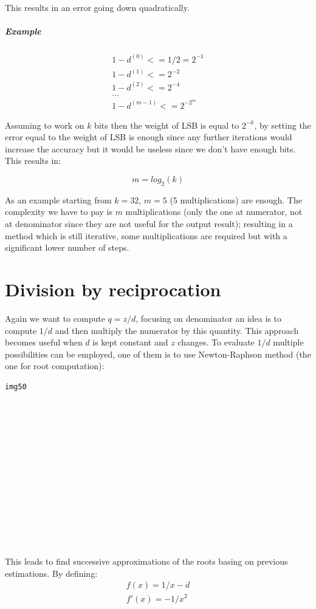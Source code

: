 This results in an error going down quadratically.

\subparagraph{Example}

\begin{eqnarray}
1-d^{(0)} <= 1/2 = 2^{-1}\\
1-d^{(1)} <= 2^{-2}\\
1-d^{(2)} <= 2^{-4}\\
...\\
1-d^{(m-1)} <= 2^{-2^m}
\end{eqnarray}

Assuming to work on $k$ bits then the weight of LSB is equal to $2^{-k}$, by setting the error equal to the weight of LSB is enough since any further iterations would increase the accuracy but it would be useless since we don't have enough bits. This results in:

$$m=log_2 (k)$$

As an example starting from $k=32$, $m=5$ (5 multiplications) are enough. The complexity we have to pay is $m$ multiplications (only the one at numerator, not at denominator since they are not useful for the output result); resulting in a method which is still iterative, some multiplications are required but with a significant lower number of steps.

\section{Division by reciprocation}

Again we want to compute $q=z/d$, focusing on denominator an idea is to compute $1/d$ and then multiply the numerator by this quantity. This approach becomes useful when $d$ is kept constant and $z$ changes. To evaluate $1/d$ multiple possibilities can be employed, one of them is to use Newton-Raphson method (the one for root computation):

\begin{verbatim}
img50














\end{verbatim}

This leads to find successive approximations of the roots basing on previous estimations. By defining:
\begin{eqnarray}
f(x)=1/x -d \\
f'(x)=-1/x^2
\end{eqnarray}

